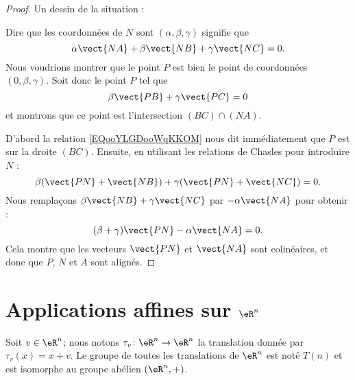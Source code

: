 \begin{proof}
	Un dessin de la situation :

	\begin{center}
		
	\end{center}

	Dire que les coordonnées de \( N\) sont \( (\alpha,\beta,\gamma)\) signifie que
	\begin{equation}
		\alpha\vect{ NA }+\beta\vect{ NB }+\gamma\vect{ NC }=0.
	\end{equation}
	Nous voudrions montrer que le point \( P\) est bien le point de coordonnées \( (0,\beta,\gamma)\). Soit donc le point \( P\) tel que
	\begin{equation}        \label{EQooYLGDooWqKKOM}
		\beta\vect{ PB }+\gamma\vect{ PC }=0
	\end{equation}
	et montrons que ce point est l'intersection \( (BC)\cap (NA)\).

	D'abord la relation \eqref{EQooYLGDooWqKKOM} nous dit immédiatement que \( P\) est sur la droite \( (BC)\). Ensuite, en utilisant les relations de Chasles pour introduire \( N\) :
	\begin{equation}
		\beta(\vect{ PN }+\vect{ NB })+\gamma(\vect{ PN }+\vect{ NC })=0.
	\end{equation}
	Nous remplaçons \( \beta\vect{ NB }+\gamma\vect{ NC }\) par \( -\alpha\vect{ NA }\) pour obtenir :
	\begin{equation}
		(\beta+\gamma)\vect{ PN }-\alpha\vect{ NA }=0.
	\end{equation}
	Cela montre que les vecteurs \( \vect{ PN }\) et \( \vect{ NA }\) sont colinéaires, et donc que \( P\), \( N\) et \( A\) sont alignés.
\end{proof}

\section{Applications affines sur \( \eR^n\)}

Soit \( v\in \eR^n\); nous notons \( \tau_v\colon \eR^n\to \eR^n\) la translation donnée par \( \tau_v(x)=x+v\). Le groupe de toutes les translations de \( \eR^n\) est noté \( T(n)\) et est isomorphe au groupe abélien \( (\eR^n,+)\).

